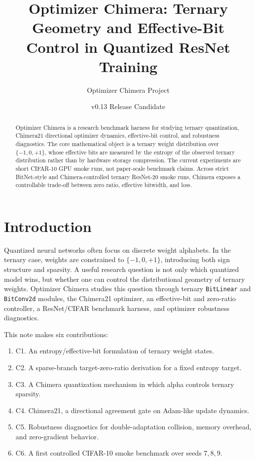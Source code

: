 \documentclass[11pt]{article}
\title{Optimizer Chimera: Ternary Geometry and Effective-Bit Control in Quantized ResNet Training}
\author{Optimizer Chimera Project}
\date{v0.13 Release Candidate}
\begin{document}
\maketitle

\begin{abstract}
Optimizer Chimera is a research benchmark harness for studying ternary quantization, Chimera21 directional optimizer dynamics, effective-bit control, and robustness diagnostics. The core mathematical object is a ternary weight distribution over $\{-1,0,+1\}$, whose effective bits are measured by the entropy of the observed ternary distribution rather than by hardware storage compression. The current experiments are short CIFAR-10 GPU smoke runs, not paper-scale benchmark claims. Across strict BitNet-style and Chimera-controlled ternary ResNet-20 smoke runs, Chimera exposes a controllable trade-off between zero ratio, effective bitwidth, and loss.
\end{abstract}

\section{Introduction}

Quantized neural networks often focus on discrete weight alphabets. In the ternary case, weights are constrained to $\{-1,0,+1\}$, introducing both sign structure and sparsity. A useful research question is not only which quantized model wins, but whether one can control the distributional geometry of ternary weights. Optimizer Chimera studies this question through ternary \texttt{BitLinear} and \texttt{BitConv2d} modules, the Chimera21 optimizer, an effective-bit and zero-ratio controller, a ResNet/CIFAR benchmark harness, and optimizer robustness diagnostics.

This note makes six contributions:
\begin{enumerate}
    \item C1. An entropy/effective-bit formulation of ternary weight states.
    \item C2. A sparse-branch target-zero-ratio derivation for a fixed entropy target.
    \item C3. A Chimera quantization mechanism in which alpha controls ternary sparsity.
    \item C4. Chimera21, a directional agreement gate on Adam-like update dynamics.
    \item C5. Robustness diagnostics for double-adaptation collision, memory overhead, and zero-gradient behavior.
    \item C6. A first controlled CIFAR-10 smoke benchmark over seeds $7,8,9$.
\end{enumerate}
\end{document}
